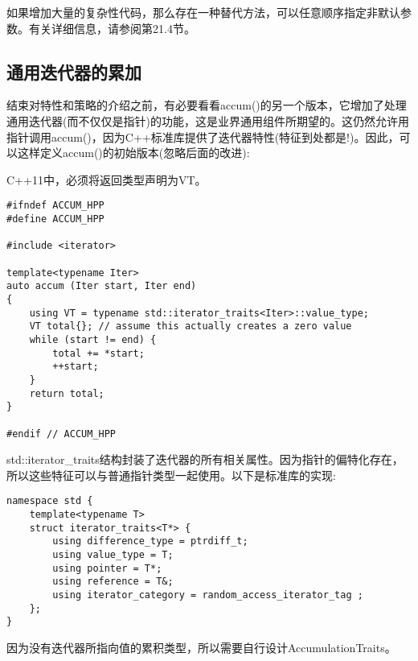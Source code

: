 如果增加大量的复杂性代码，那么存在一种替代方法，可以任意顺序指定非默认参数。有关详细信息，请参阅第21.4节。

\subsection{通用迭代器的累加}

结束对特性和策略的介绍之前，有必要看看accum()的另一个版本，它增加了处理通用迭代器(而不仅仅是指针)的功能，这是业界通用组件所期望的。这仍然允许用指针调用accum()，因为C++标准库提供了迭代器特性(特征到处都是!)。因此，可以这样定义accum()的初始版本(忽略后面的改进):

\begin{tcolorbox}[colback=webgreen!5!white,colframe=webgreen!75!black]
\hspace*{0.75cm}C++11中，必须将返回类型声明为VT。
\end{tcolorbox}

\begin{lstlisting}[style=styleCXX]
#ifndef ACCUM_HPP
#define ACCUM_HPP

#include <iterator>

template<typename Iter>
auto accum (Iter start, Iter end)
{
	using VT = typename std::iterator_traits<Iter>::value_type;
	VT total{}; // assume this actually creates a zero value
	while (start != end) {
		total += *start;
		++start;
	}
	return total;
}

#endif // ACCUM_HPP
\end{lstlisting}

std::iterator\_traits结构封装了迭代器的所有相关属性。因为指针的偏特化存在，所以这些特征可以与普通指针类型一起使用。以下是标准库的实现:

\begin{lstlisting}[style=styleCXX]
namespace std {
	template<typename T>
	struct iterator_traits<T*> {
		using difference_type = ptrdiff_t;
		using value_type = T;
		using pointer = T*;
		using reference = T&;
		using iterator_category = random_access_iterator_tag ;
	};
}
\end{lstlisting}

因为没有迭代器所指向值的累积类型，所以需要自行设计AccumulationTraits。









